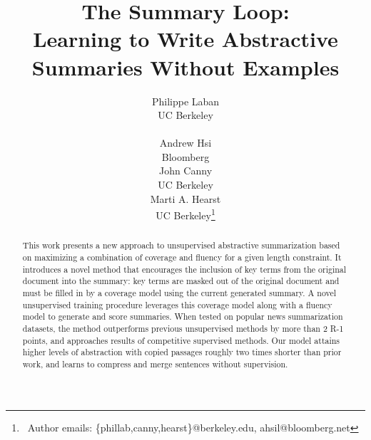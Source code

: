 \documentclass[11pt,a4paper]{article}
\title{The Summary  Loop: \\ Learning to Write Abstractive Summaries Without Examples}
\author{Philippe Laban \\
  UC Berkeley \\
   \\
  \And
  Andrew Hsi \\
  Bloomberg\\
  \And
  John Canny \\
  UC Berkeley\\
  \And
  Marti A. Hearst \\
  UC Berkeley\thanks{~Author emails: \{phillab,canny,hearst\}@berkeley.edu, ahsil@bloomberg.net} \\
}
\date{}
\begin{document}
\maketitle
\begin{abstract}
This work presents a new approach to unsupervised abstractive summarization based on maximizing a combination of coverage and fluency for a given length constraint. It introduces a novel method that encourages the inclusion of key terms from the original document into the summary: key terms are masked out of the original document and must be filled in by a coverage model using the current generated summary. A novel unsupervised training procedure leverages this coverage model along with a fluency model to generate and score summaries.
When tested on popular news summarization datasets, the method outperforms previous unsupervised methods by more than 2 R-1 points, and approaches results of competitive supervised methods. Our model attains higher levels of abstraction with copied passages roughly two times shorter than prior work, and learns to compress and merge sentences without supervision.

\end{abstract}
\end{document}
